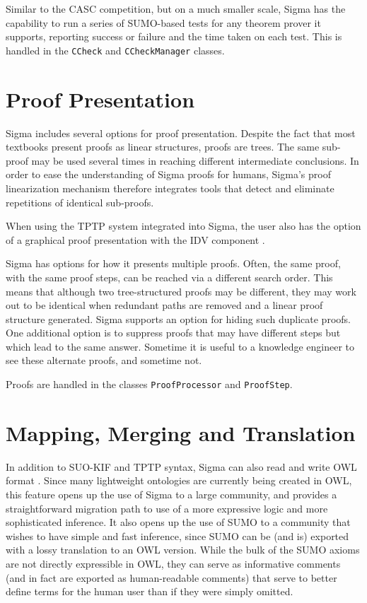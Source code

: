 \documentclass{book}
\begin{document}
Similar to the CASC competition, but on a much smaller scale, Sigma
has the capability to run a series of SUMO-based tests for any theorem prover it
supports, reporting success or failure and the time taken on each test.  This is
handled in the \texttt{CCheck} and \texttt{CCheckManager} classes.


\section{Proof Presentation}
\label{chap:SUMOInfe:sec:Proo}

Sigma includes several options for proof presentation. Despite the fact that
most textbooks present proofs as linear structures, proofs are trees. The same
sub-proof may be used several times in reaching different intermediate
conclusions. In order to ease the understanding of Sigma proofs for humans,
Sigma's proof linearization mechanism therefore integrates tools that detect and
eliminate repetitions of identical sub-proofs.

\begin{sloppypar}
When using the TPTP system integrated into Sigma, the user also has the option
of a graphical proof presentation with the IDV component \cite{trac2007}.
\end{sloppypar}

Sigma has options for how it presents multiple proofs. Often, the same proof,
with the same proof steps, can be reached via a different search order. This
means that although two tree-structured proofs may be different, they may work
out to be identical when redundant paths are removed and a linear proof
structure generated. Sigma supports an option for hiding such duplicate proofs.
One additional option is to suppress proofs that may have different steps but
which lead to the same answer. Sometime it is useful to a knowledge engineer to
see these alternate proofs, and sometime not.

Proofs are handled in the classes
\texttt{ProofProcessor} and
\texttt{ProofStep}.


\section{Mapping, Merging and Translation}
\label{chap:KnowEngi:sec:Mapp}

In addition to SUO-KIF and TPTP syntax, Sigma can also read and write OWL format
\cite{bechhofer2004owl}. Since many lightweight ontologies are currently being
created in OWL, this feature opens up the use of Sigma to a large community, and
provides a straightforward migration path to use of a more expressive logic and
more sophisticated inference.  It also opens up the use of SUMO to a community
that wishes to have simple and fast inference, since SUMO can be (and is)
exported with a lossy translation to an OWL version.  While the bulk of the SUMO
axioms are not directly expressible in OWL, they can serve as informative
comments (and in fact are exported as human-readable comments) that serve to
better define terms for the human user than if they were simply omitted.
\end{document}
